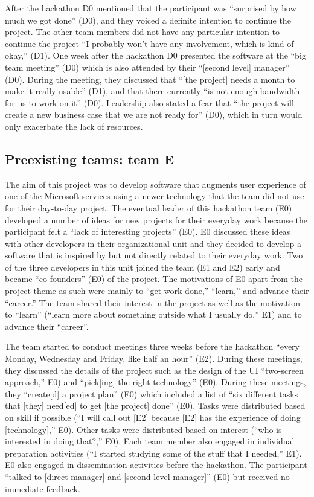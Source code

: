 \documentclass{hcij}
\begin{document}
After the hackathon D0 mentioned that the participant was “surprised by how much we got done” (D0), and they voiced a definite intention to continue the project. The other team members did not have any particular intention to continue the project “I probably won’t have any involvement, which is kind of okay,” (D1). One week after the hackathon D0 presented the software at the “big team meeting” (D0) which is also attended by their “[second level] manager” (D0). During the meeting, they discussed that “[the project] needs a month to make it really usable” (D1), and that there currently “is not enough bandwidth for us to work on it” (D0). Leadership also stated a fear that “the project will create a new business case that we are not ready for” (D0), which in turn would only exacerbate the lack of resources.

\subsection{Preexisting teams: team E}
The aim of this project was to develop software that augments user experience of one of the Microsoft services using a newer technology that the team did not use for their day-to-day project. The eventual leader of this hackathon team (E0) developed a number of ideas for new projects for their everyday work because the participant felt a “lack of interesting projects” (E0). E0 discussed these ideas with other developers in their organizational unit and they decided to develop a software that is inspired by but not directly related to their everyday work. Two of the three developers in this unit joined the team (E1 and E2) early and became “co-founders” (E0) of the project. The motivations of E0 apart from the project theme as such were mainly to “get work done,” “learn,” and advance their “career.” The team shared their interest in the project as well as the motivation to “learn” (“learn more about something outside what I usually do,” E1) and to advance their “career”.

The team started to conduct meetings three weeks before the hackathon “every Monday, Wednesday and Friday, like half an hour” (E2). During these meetings, they discussed the details of the project such as the design of the UI “two-screen approach,” E0) and “pick[ing] the right technology” (E0). During these meetings, they “create[d] a project plan” (E0) which included a list of “six different tasks that [they] need[ed] to get [the project] done” (E0). Tasks were distributed based on skill if possible (“I will call out [E2] because [E2] has the experience of doing [technology],” E0). Other tasks were distributed based on interest (“who is interested in doing that?,” E0). Each team member also engaged in individual preparation activities (“I started studying some of the stuff that I needed,” E1). E0 also engaged in dissemination activities before the hackathon. The participant “talked to [direct manager] and [second level manager]” (E0) but received no immediate feedback.
\end{document}
